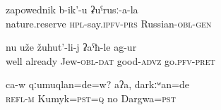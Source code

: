 		
		
\begin{exe}
	\ex	\label{ex:This is called nature reserve in Russian}
	\gll	zapowednik	b-ik'-u	ʡuˁrusː-a-la  \\
		nature.reserve	\textsc{hpl}-say.\textsc{ipfv-prs}	Russian-\textsc{obl-gen}\\
	\glt	{}

	\ex	\label{ex:Well, the Jew already felt better}
	\gll	nu	uže	žuhut'-li-j	ʡaˁħ-le	ag-ur   \\
		well	already	Jew-\textsc{obl-dat}	good-\textsc{advz}	go.\textsc{pfv-pret}\\
	\glt	{}

	\ex	\label{ex:Was he Kumyk No (he) was Dargwa}
	\gll	ca-w	qːumuqlan=de=w?	aʔa,	darkːʷan=de   \\
		\textsc{refl-m}	Kumyk=\textsc{pst=q} no Dargwa=\textsc{pst}\\
	\glt	{}
\end{exe}

